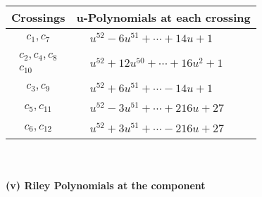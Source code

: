 \documentclass[1p]{elsarticle_modified}
\theoremstyle{definition}
\begin{document}
\begin{tabular}{m{50pt}|m{274pt}}
Crossings & \hspace{64pt}u-Polynomials at each crossing \\
\hline $$\begin{aligned}c_{1},c_{7}\end{aligned}$$&$\begin{aligned}
&u^{52}-6 u^{51}+\cdots+14 u+1
\end{aligned}$\\
\hline $$\begin{aligned}c_{2},c_{4},c_{8}\\c_{10}\end{aligned}$$&$\begin{aligned}
&u^{52}+12 u^{50}+\cdots+16 u^2+1
\end{aligned}$\\
\hline $$\begin{aligned}c_{3},c_{9}\end{aligned}$$&$\begin{aligned}
&u^{52}+6 u^{51}+\cdots-14 u+1
\end{aligned}$\\
\hline $$\begin{aligned}c_{5},c_{11}\end{aligned}$$&$\begin{aligned}
&u^{52}-3 u^{51}+\cdots+216 u+27
\end{aligned}$\\
\hline $$\begin{aligned}c_{6},c_{12}\end{aligned}$$&$\begin{aligned}
&u^{52}+3 u^{51}+\cdots-216 u+27
\end{aligned}$\\
\hline
\end{tabular}\\~\\
\newpage\renewcommand{\arraystretch}{1}
\flushleft \textbf{(v) Riley Polynomials at the component}\newline \\
\end{document}
